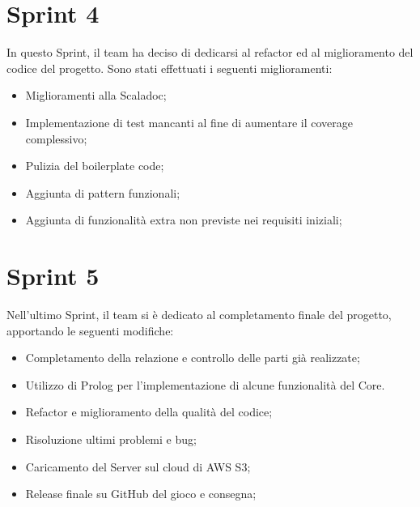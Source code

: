 \section{Sprint 4}
In questo Sprint, il team ha deciso di dedicarsi al refactor ed al miglioramento del codice del progetto. Sono stati effettuati i seguenti miglioramenti:
\begin{itemize}
    \item Miglioramenti alla Scaladoc;
    \item Implementazione di test mancanti al fine di aumentare il coverage complessivo;
    \item Pulizia del boilerplate code;
    \item Aggiunta di pattern funzionali;
    \item Aggiunta di funzionalità extra non previste nei requisiti iniziali;
\end{itemize}

\section{Sprint 5}
Nell'ultimo Sprint, il team si \`e dedicato al completamento finale del progetto, apportando le seguenti modifiche:
\begin{itemize}
    \item Completamento della relazione e controllo delle parti gi\`a realizzate;
    \item Utilizzo di Prolog per l'implementazione di alcune funzionalità del Core.
    \item Refactor e miglioramento della qualit\`a del codice;
    \item Risoluzione ultimi problemi e bug;
    \item Caricamento del Server sul cloud di AWS S3;
    \item Release finale su GitHub del gioco e consegna;
\end{itemize}
